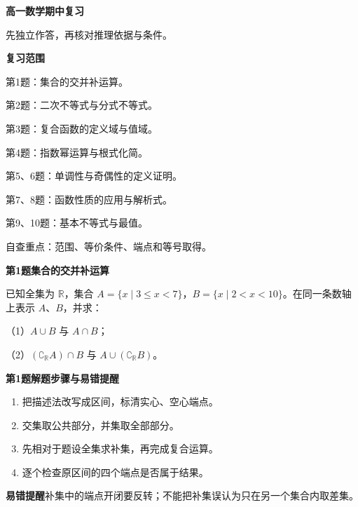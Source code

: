 \documentclass[UTF8,10pt,aspectratio=169]{ctexbeamer}
\newcommand{\LessonTitle}{高一数学期中复习}
\newcommand{\LessonSubtitle}{考前重点十题}
\newcommand{\LessonInfo}{解题步骤\qquad 规范解答\qquad 易错提醒}
\newcommand{\PageHeading}[1]{\begin{center}{\Large\bfseries #1}\end{center}\vspace{0.12cm}}
\newcommand{\subq}[1]{\par\vspace{0.15cm}（#1）}
\begin{document}
\begin{frame}[t]
\PageHeading{\LessonTitle}
\begin{center}\vspace{0.7cm}{\LARGE\bfseries\LessonSubtitle}\par\vspace{0.6cm}{\large\LessonInfo}\end{center}
\par
\vspace{0.5cm}先独立作答，再核对推理依据与条件。
\par
\end{frame}
\begin{frame}[t]
\PageHeading{复习范围}
第1题：集合的交并补运算。\par 第2题：二次不等式与分式不等式。\par 第3题：复合函数的定义域与值域。\par 第4题：指数幂运算与根式化简。
\par
第5、6题：单调性与奇偶性的定义证明。\par 第7、8题：函数性质的应用与解析式。\par 第9、10题：基本不等式与最值。
\par
\vspace{0.25cm}自查重点：范围、等价条件、端点和等号取得。
\par
\end{frame}
\begin{frame}[t]
\PageHeading{第1题\quad 集合的交并补运算}
已知全集为 $\mathbb R$，集合 $A=\{x\mid 3\le x<7\}$，$B=\{x\mid 2<x<10\}$。在同一条数轴上表示 $A$、$B$，并求：
\subq{1}$A\cup B$ 与 $A\cap B$；
\subq{2}$(\complement_{\mathbb R}A)\cap B$ 与 $A\cup(\complement_{\mathbb R}B)$。
\par
\end{frame}
\begin{frame}[t]
\PageHeading{第1题\quad 解题步骤与易错提醒}
\begin{enumerate}\item 把描述法改写成区间，标清实心、空心端点。
\item 交集取公共部分，并集取全部部分。
\item 先相对于题设全集求补集，再完成复合运算。
\item 逐个检查原区间的四个端点是否属于结果。\end{enumerate}
\par
\pause
\vspace{0.18cm}\textbf{易错提醒}\quad 补集中的端点开闭要反转；不能把补集误认为只在另一个集合内取差集。
\par
\end{frame}
\end{document}

